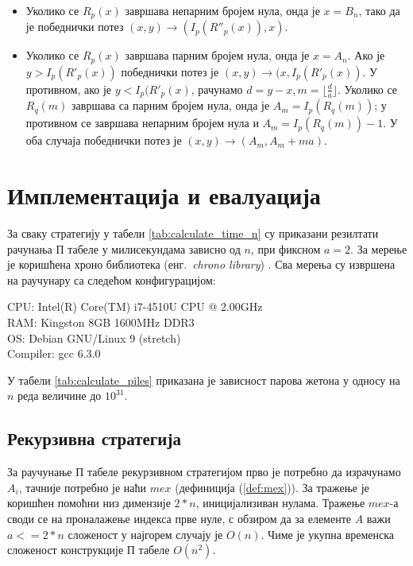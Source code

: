 \documentclass[a4paper]{article}
\begin{document}
\begin{itemize}
	\item Уколико се $ R_{p}(x) $ завршава непарним бројем нула, онда је $ x = B_{n} $, тако да је победнички потез $ (x, y) \rightarrow (I_{p}(R''_{p}(x)), x) $.
	\item Уколико се $ R_{p}(x) $ завршава парним бројем нула, онда је $ x = A_{n} $. Ако је $ y > I_{p}(R'_{p}(x)) $ победнички потез је $ (x, y) \rightarrow (x, I_{p}(R'_{p}(x)) $. У противном, ако је $ y < I_{p}(R'_{p}(x) $, рачунамо $ d = y - x, m = \lfloor \frac{d}{a} \rfloor $. Уколико се $ R_{q}(m) $ завршава са парним бројем нула, онда је $ A_{m} = I_{p}(R_{q}(m)) $; у противном се завршава непарним бројем нула и $ A_{m} = I_{p}(R_{q}(m)) - 1 $. У оба случаја победнички потез је $ (x, y) \rightarrow (A_{m}, A_{m} + ma) $.
\end{itemize}

\section{Имплементација и евалуација}
\label{implementacija_evaluacija}

За сваку стратегију у табели \ref{tab:calculate_time_n} су приказани резилтати рачунања П табеле у милисекундама зависно од $ n $, при фиксном $ a = 2 $. 
За мерење је коришћена хроно библиотека (енг.{~\em chrono library}) \cite{chrono_library}. Сва мерења су извршена на раучунару са следећом конфигурацијом:
\begin{flushleft}
	CPU: Intel(R) Core(TM) i7-4510U CPU @ 2.00GHz\\
	RAM: Kingston 8GB 1600MHz DDR3\\
	OS: Debian GNU/Linux 9 (stretch)\\
	Compiler: gcc 6.3.0\\
\end{flushleft}

У табели \ref{tab:calculate_piles} приказана је зависност парова жетона у односу на $ n $ реда величине до $ 10^{31} $.

\subsection{Рекурзивна стратегија}

За раучунање П табеле рекурзивном стратегијом прво је потребно да израчунамо $ A_{i} $, тачније потребно је наћи $ mex $ (дефиниција (\ref{def:mex})). За тражење је коришћен помоћни низ димензије $ 2*n $, иницијализиван нулама. Тражење $ mex $-а  своди се на проналажење индекса прве нуле, с обзиром да за елементе $ A $ важи $ a <= 2*n $ сложеност у најгорем случају је $ O(n) $. Чиме је укупна временска сложеност конструкције П табеле $ O(n^2) $.\\
\end{document}
